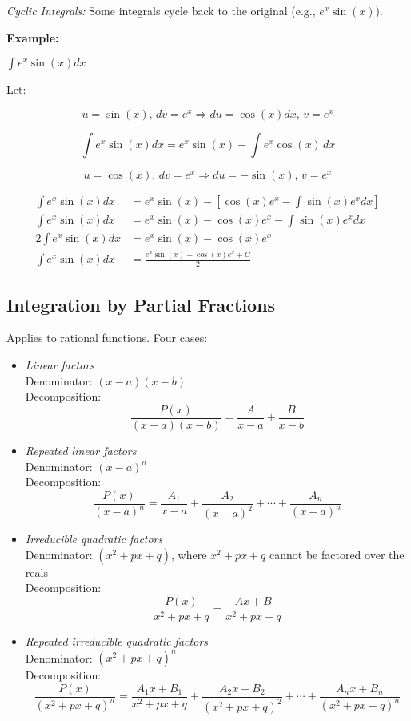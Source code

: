 \emph{Cyclic Integrals:} Some integrals cycle back to the original (e.g., \(e^x \sin(x)\)).

\textbf{Example:}

\(\int e^x \sin(x)dx\)

Let:

\[
    u = \sin (x), \, dv = e^x \Rightarrow du = \cos (x)dx, \, v = e^x
\]

\[
    \int e^x \sin(x)dx = e^x \sin (x) - \int e^x \cos(x)\,dx 
\]

\[
    u = \cos(x), \, dv = e^x \Rightarrow du = -\sin(x), \, v = e^x
\]

\begin{align*}
    \int e^x \sin(x)dx &= e^x \sin (x) - \left[\cos(x)e^x - \int \sin(x)e^x dx \right] \\
    \int e^x \sin(x)dx &= e^x \sin (x) - \cos(x)e^x - \int \sin(x)e^x dx \\
    2\int e^x \sin(x)dx &= e^x \sin (x) - \cos(x)e^x \\
    \int e^x \sin(x)dx &= \frac{e^x \sin (x) +\cos(x)e^x + C}{2}
\end{align*}

\subsection{Integration by Partial Fractions}

Applies to rational functions. Four cases:

\begin{itemize}

    \item \emph{Linear factors} \\
    Denominator: \((x - a)(x - b)\) \\
    Decomposition: 
    \[
        \frac{P(x)}{(x - a)(x - b)} = \frac{A}{x - a} + \frac{B}{x - b}
    \]

    \item \emph{Repeated linear factors} \\
    Denominator: \((x - a)^n\) \\
    Decomposition: 
    \[
        \frac{P(x)}{(x - a)^n} = \frac{A_1}{x - a} + \frac{A_2}{(x - a)^2} + \cdots + \frac{A_n}{(x - a)^n}
    \]

    \item \emph{Irreducible quadratic factors} \\
    Denominator: \((x^2 + px + q)\), where \(x^2 + px + q\) cannot be factored over the reals \\
    Decomposition:
    \[
        \frac{P(x)}{x^2 + px + q} = \frac{Ax + B}{x^2 + px + q}
    \]

    \item \emph{Repeated irreducible quadratic factors} \\
    Denominator: \((x^2 + px + q)^n\) \\
    Decomposition:
    \[
        \frac{P(x)}{(x^2 + px + q)^n} = \frac{A_1x + B_1}{x^2 + px + q} + \frac{A_2x + B_2}{(x^2 + px + q)^2} + \cdots + \frac{A_nx + B_n}{(x^2 + px + q)^n}
    \]

\end{itemize}


